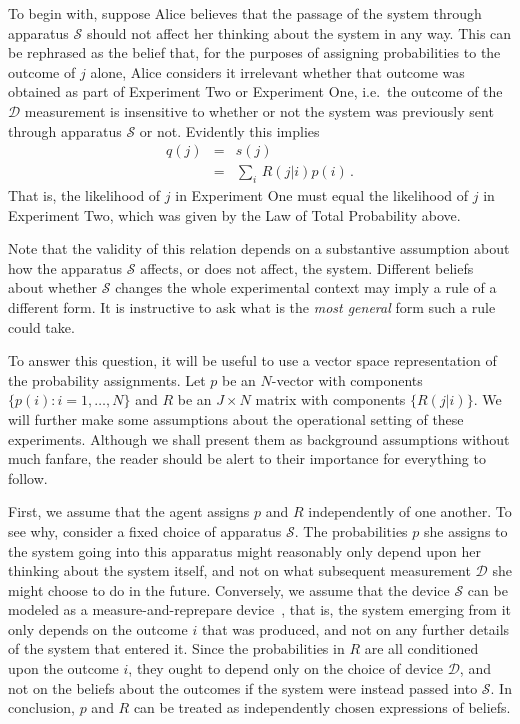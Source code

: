 \documentclass[%
 reprint,superscriptaddress,
 amsmath,amssymb,
 aps,twocolumn,pra
]{revtex4-1}
\newcommand{\eqn}[1]{\begin{eqnarray} #1 \end{eqnarray}}
\newcommand{\tit}[1]{\textit{#1}}
\newcommand{\zum}[2]{\displaystyle\sum_{#1}^{#2}}
\newcommand{\onestage}{{One}}
\newcommand{\twostage}{{Two}}
\begin{document}
To begin with, suppose Alice believes that the passage of the system through apparatus $\mathcal{S}$ should not affect her thinking about the system in any way. This can be rephrased as the belief that, for the purposes of assigning probabilities to the outcome of $j$ alone, Alice considers it irrelevant whether that outcome was obtained as part of Experiment \twostage{} or Experiment \onestage, i.e.\ the outcome of the $\mathcal{D}$ measurement is insensitive to whether or not the system was previously sent through apparatus $\mathcal{S}$ or not. Evidently this implies
\eqn{
q(j) &=& s(j) \, \nonumber \\
&=& \zum{i}{}\, R(j|i)p(i) \, .
}
That is, the likelihood of $j$ in Experiment \onestage{} must equal the likelihood of $j$ in Experiment \twostage, which was given by the Law of Total Probability above.

Note that the validity of this relation depends on a substantive assumption about how the apparatus $\mathcal{S}$ affects, or does not affect, the system. Different beliefs about whether $\mathcal{S}$ changes the whole experimental context may imply a rule of a different form. It is instructive to ask what is the \tit{most general} form such a rule could take.

To answer this question, it will be useful to use a vector space representation of the probability assignments. Let $p$ be an $N$-vector with components $\{ p(i) : i=1,\dots,N \}$ and $R$ be an $J\times N$ matrix with components $\{ R(j|i) \}$.  We will further make some assumptions about the operational setting of these experiments. Al\-though we shall present them as background assumptions without much fanfare, the reader should be alert to their importance for everything to follow.

First, we assume that the agent assigns $p$ and $R$ independently of one another. To see why, consider a fixed choice of apparatus $\mathcal{S}$. The probabilities $p$ she assigns to the system going into this apparatus might reasonably only depend upon her thinking about the system itself, and not on what subsequent measurement $\mathcal{D}$ she might choose to do in the future. Conversely, we assume that the device $\mathcal{S}$ can be modeled as a measure-and-reprepare device~\cite{DeBrota20b}, that is, the system emerging from it only depends on the outcome $i$ that was produced, and not on any further details of the system that entered it. Since the probabilities in $R$ are all conditioned upon the outcome $i$, they ought to depend only on the choice of device $\mathcal{D}$, and not on the beliefs about the outcomes if the system were instead passed into $\mathcal{S}$. In conclusion, $p$ and $R$ can be treated as independently chosen expressions of beliefs.
\end{document}
